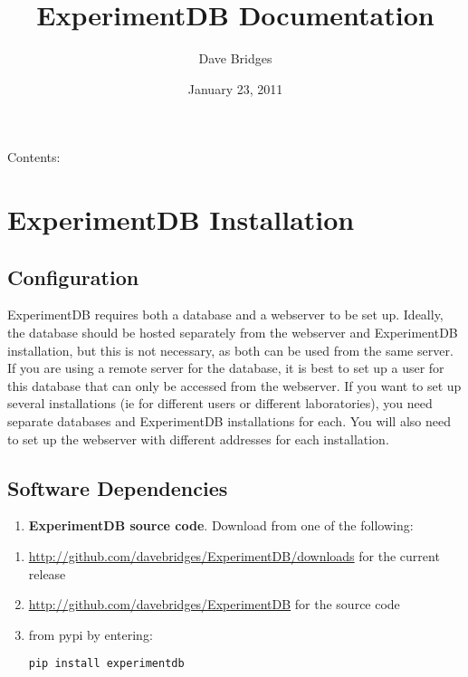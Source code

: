 \documentclass[letterpaper,10pt,english]{sphinxmanual}
\title{ExperimentDB Documentation}
\date{January 23, 2011}
\author{Dave Bridges}
\begin{document}
\maketitle
\tableofcontents
{}\label{index::doc}


Contents:



\chapter{ExperimentDB Installation}
\label{installation:experimentdb-installation}\label{installation::doc}\label{installation:welcome-to-experimentdb-s-documentation}

\section{Configuration}
\label{installation:configuration}
ExperimentDB requires both a database and a webserver to be set up.  Ideally, the database should be hosted separately from the webserver and ExperimentDB installation, but this is not necessary, as both can be used from the same server.  If you are using a remote server for the database, it is best to set up a user for this database that can only be accessed from the webserver.  If you want to set up several installations (ie for different users or different laboratories), you need separate databases and ExperimentDB installations for each.  You will also need to set up the webserver with different addresses for each installation.



\section{Software Dependencies}
\label{installation:software-dependencies}\begin{enumerate}
\item {} 
\textbf{ExperimentDB source code}.  Download from one of the following:


\end{enumerate}
\begin{enumerate}
\item {} 
\href{http://github.com/davebridges/ExperimentDB/downloads}{http://github.com/davebridges/ExperimentDB/downloads} for the current release


\item {} 
\href{http://github.com/davebridges/ExperimentDB}{http://github.com/davebridges/ExperimentDB} for the source code


\item {} 
from pypi by entering:


\begin{Verbatim}[commandchars=@\[\]]
pip install experimentdb
\end{Verbatim}

\end{enumerate}
\end{document}
